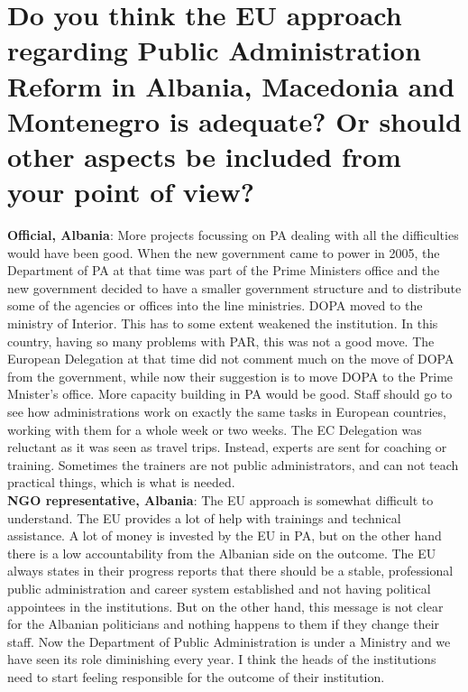 \section{Do you think the EU approach regarding Public Administration Reform in Albania, Macedonia and Montenegro is adequate? Or should other aspects be included from your point of view?}
\label{sec:par view}
\textbf{Official, Albania}: More projects focussing on PA dealing with all the difficulties would have been good. When the new government came to power in 2005, the Department of PA at that time was part of the Prime Ministers office and the new government decided to have a smaller government structure and to distribute some of the agencies or offices into the line ministries. DOPA moved to the ministry of Interior. This has to some extent weakened the institution. In this country, having so many problems with PAR, this was not a good move. The European Delegation at that time did not comment much on the move of DOPA from the government, while now their suggestion is to move DOPA to the Prime Mnister’s office. More capacity building in PA would be good. Staff should go to see how administrations work on exactly the same tasks in European countries, working with them for a whole week or two weeks. The EC Delegation was reluctant as it was seen as travel trips. Instead, experts are sent for coaching or training. Sometimes the trainers are not public administrators, and can not teach practical things, which is what is needed. \\
\textbf{NGO representative, Albania}: The EU approach is somewhat difficult to understand. The EU provides a lot of help with trainings and technical assistance. A lot of money is invested by the EU in PA, but on the other hand there is a low accountability from the Albanian side on the outcome. The EU always states in their progress reports that there should be a stable, professional public administration and career system established and not having political appointees in the institutions. But on the other hand, this message is not clear for the Albanian politicians and nothing happens to them if they change their staff. Now the Department of Public Administration is under a Ministry and we have seen its role diminishing every year.  I think the heads of the institutions need to start feeling responsible for the outcome of their institution.  \\
